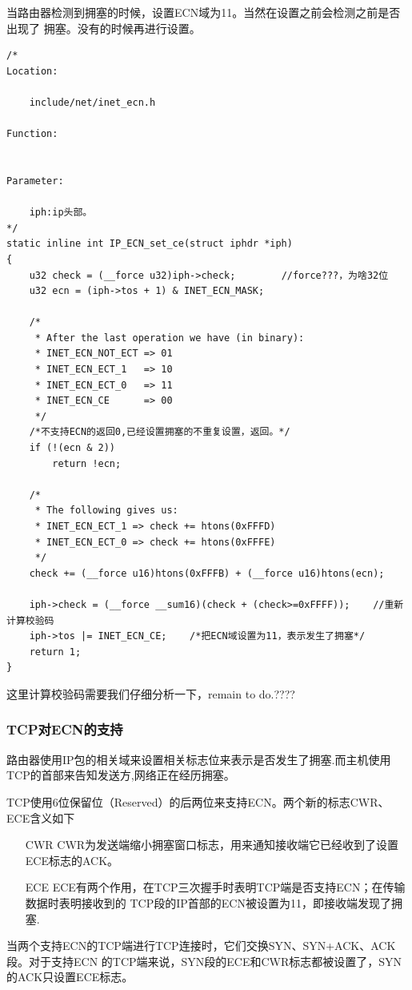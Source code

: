 			当路由器检测到拥塞的时候，设置ECN域为11。当然在设置之前会检测之前是否出现了
			拥塞。没有的时候再进行设置。

\begin{verbatim}
/*
Location:

	include/net/inet_ecn.h

Function:


Parameter:

	iph:ip头部。
*/
static inline int IP_ECN_set_ce(struct iphdr *iph)
{
	u32 check = (__force u32)iph->check;		//force???，为啥32位
	u32 ecn = (iph->tos + 1) & INET_ECN_MASK;

	/*
	 * After the last operation we have (in binary):
	 * INET_ECN_NOT_ECT => 01
	 * INET_ECN_ECT_1   => 10
	 * INET_ECN_ECT_0   => 11
	 * INET_ECN_CE      => 00
	 */
	/*不支持ECN的返回0,已经设置拥塞的不重复设置，返回。*/
	if (!(ecn & 2))			
		return !ecn;
	
	/*
	 * The following gives us:
	 * INET_ECN_ECT_1 => check += htons(0xFFFD)
	 * INET_ECN_ECT_0 => check += htons(0xFFFE)
	 */
	check += (__force u16)htons(0xFFFB) + (__force u16)htons(ecn);
	
	iph->check = (__force __sum16)(check + (check>=0xFFFF));	//重新计算校验码
	iph->tos |= INET_ECN_CE;	/*把ECN域设置为11，表示发生了拥塞*/
	return 1;
}
\end{verbatim}

		这里计算校验码需要我们仔细分析一下，remain to do.????
		
		\subsubsection{TCP对ECN的支持}
			路由器使用IP包的相关域来设置相关标志位来表示是否发生了拥塞.而主机使用TCP的首部来告知发送方,网络正在经历拥塞。
			
			TCP使用6位保留位（Reserved）的后两位来支持ECN。两个新的标志CWR、ECE含义如下
\begin{enumerate}
\item[CWR]	CWR为发送端缩小拥塞窗口标志，用来通知接收端它已经收到了设置ECE标志的ACK。
			
\item[ECE]	ECE有两个作用，在TCP三次握手时表明TCP端是否支持ECN；在传输数据时表明接收到的
			TCP段的IP首部的ECN被设置为11，即接收端发现了拥塞.
\end{enumerate}

			当两个支持ECN的TCP端进行TCP连接时，它们交换SYN、SYN+ACK、ACK段。对于支持ECN
			的TCP端来说，SYN段的ECE和CWR标志都被设置了，SYN的ACK只设置ECE标志。

